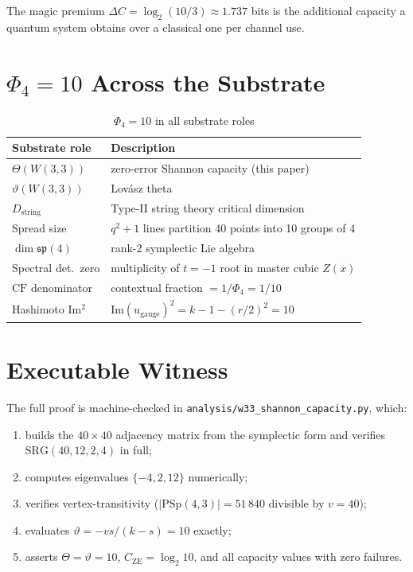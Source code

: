 \documentclass[11pt]{article}
\begin{document}
The magic premium $\Delta C = \log_2(10/3) \approx 1.737$ bits is the additional
capacity a quantum system obtains over a classical one per channel use.

\section{$\Phi_4 = 10$ Across the Substrate}

\begin{table}[h]
\centering
\caption{$\Phi_4 = 10$ in all substrate roles}
\begin{tabular}{ll}
\toprule
Substrate role & Description \\
\midrule
$\Theta(W(3,3))$ & zero-error Shannon capacity (this paper) \\
$\vartheta(W(3,3))$ & Lov\'asz theta \\
$D_{\mathrm{string}}$ & Type-II string theory critical dimension \\
Spread size & $q^2+1$ lines partition 40 points into 10 groups of 4 \\
$\dim\mathfrak{sp}(4)$ & rank-2 symplectic Lie algebra \\
Spectral det.\ zero & multiplicity of $t=-1$ root in master cubic $Z(x)$ \\
$\mathrm{CF}$ denominator & contextual fraction $= 1/\Phi_4 = 1/10$ \\
Hashimoto Im$^2$ & $\mathrm{Im}(u_{\mathrm{gauge}})^2 = k-1-(r/2)^2 = 10$ \\
\bottomrule
\end{tabular}
\end{table}

\section{Executable Witness}

The full proof is machine-checked in
\texttt{analysis/w33\_shannon\_capacity.py}, which:
\begin{enumerate}[nosep]
\item builds the $40\times 40$ adjacency matrix from the symplectic form
  and verifies $\mathrm{SRG}(40,12,2,4)$ in full;
\item computes eigenvalues $\{-4, 2, 12\}$ numerically;
\item verifies vertex-transitivity ($|\mathrm{PSp}(4,3)| = 51\,840$ divisible by $v=40$);
\item evaluates $\vartheta = -vs/(k-s) = 10$ exactly;
\item asserts $\Theta = \vartheta = 10$, $C_{\mathrm{ZE}} = \log_2 10$, and all
  capacity values with zero failures.
\end{enumerate}
\end{document}
